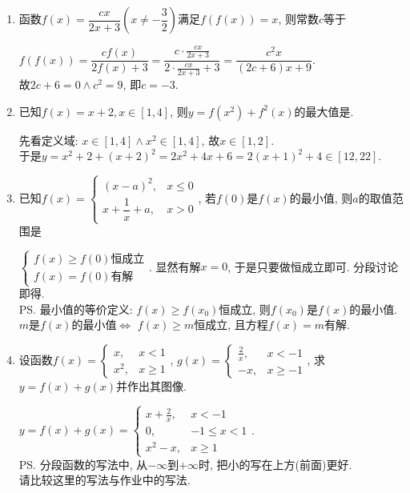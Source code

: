 \begin{enumerate}
\item 函数$f(x)=\dfrac{cx}{2x+3}\left(x\neq-\dfrac{3}{2}\right)$满足$f(f(x))=x$, 则常数$c$等于
\begin{jieda}
$f(f(x))=\dfrac{cf(x)}{2f(x)+3}=\dfrac{c\cdot\frac{cx}{2x+3}}{2\cdot\frac{cx}{2x+3}+3}=\dfrac{c^2x}{(2c+6)x+9}$. \\
故$2c+6=0\land c^2=9$, 即$c=-3$. 
\end{jieda}

\item 已知$f(x)=x+2, x\in[1,4]$, 则$y=f(x^2)+f^2(x)$的最大值是. 
\begin{jieda}
先看定义域: $x\in[1,4]\land x^2\in[1,4]$, 故$x\in[1,2]$. \\
于是$y=x^2+2+(x+2)^2=2x^2+4x+6=2(x+1)^2+4\in[12,22]$. 
\end{jieda}

\item 已知$f(x)=\begin{cases}
(x-a)^2, & x\leq 0\\
x+\dfrac{1}{x}+a, & x>0
\end{cases}$, 
若$f(0)$是$f(x)$的最小值, 则$a$的取值范围是\blkda{$[0,2]$}
\begin{jieda}
$\begin{cases}
f(x)\geq f(0)\text{恒成立}\\
f(x)=f(0)\text{有解}
\end{cases}$. 
显然有解$x=0$, 于是只要做恒成立即可. 分段讨论即得. \\
\ps 最小值的等价定义: $f(x)\geq f(x_0)$恒成立, 则$f(x_0)$是$f(x)$的最小值.\\
$m$是$f(x)$的最小值$\iff$ $f(x)\geq m$恒成立, 且方程$f(x)=m$有解. 
\end{jieda}

\item 设函数$f(x)=\begin{cases}
x, & x<1\\
x^2, & x\geq 1
\end{cases}$, 
$g(x)=\begin{cases}
\frac{2}{x}, & x<-1\\
-x, & x\geq -1
\end{cases}$, 
求$y=f(x)+g(x)$并作出其图像. 
\begin{jieda}
$y=f(x)+g(x)=\begin{cases}
x+\frac{2}{x}, & x<-1\\
0, & -1\leq x<1\\
x^2-x, & x\geq 1
\end{cases}$. \\
\ps 分段函数的写法中, 从$-\infty$到$+\infty$时, 把小的写在上方(前面)更好. \\
请比较这里的写法与作业中的写法. 
\end{jieda}


\end{enumerate}
